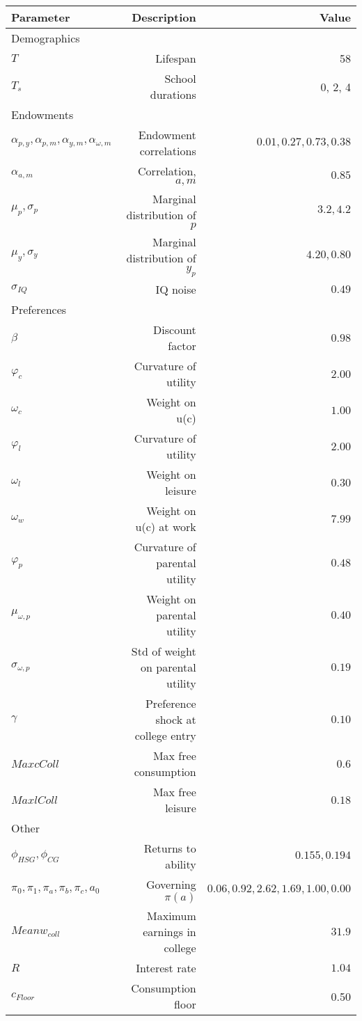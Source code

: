 \begin{tabular}{lrr}
\hline
Parameter & Description  & Value  \\
\hline
Demographics &   &   \\
$T$ & Lifespan  & 58  \\
$T_{s}$ & School durations  & 0, 2, 4  \\
Endowments &   &   \\
$\alpha_{p,y}, \alpha_{p,m}, \alpha_{y,m}, \alpha_{\omega,m}$ & Endowment correlations  & $0.01, 0.27, 0.73, 0.38$  \\
$\alpha_{a,m}$ & Correlation, $a,m$  & $0.85$  \\
$\mu_{p}, \sigma_{p}$ & Marginal distribution of $p$  & $3.2, 4.2$  \\
$\mu_{y}, \sigma_{y}$ & Marginal distribution of $y_{p}$  & $4.20, 0.80$  \\
$\sigma_{IQ}$ & IQ noise  & $0.49$  \\
Preferences &   &   \\
$\beta$ & Discount factor  & $0.98$  \\
$\varphi_{c}$ & Curvature of utility  & $2.00$  \\
$\omega_{c}$ & Weight on u(c)  & $1.00$  \\
$\varphi_{l}$ & Curvature of utility  & $2.00$  \\
$\omega_{l}$ & Weight on leisure  & $0.30$  \\
$\omega_{w}$ & Weight on u(c) at work  & $7.99$  \\
$\varphi_{p}$ & Curvature of parental utility  & $0.48$  \\
$\mu_{\omega,p}$ & Weight on parental utility  & $0.40$  \\
$\sigma_{\omega,p}$ & Std of weight on parental utility  & $0.19$  \\
$\gamma$ & Preference shock at college entry  & $0.10$  \\
$Max cColl$ & Max free consumption  & $0.6$  \\
$Max lColl$ & Max free leisure  & $0.18$  \\
Other &   &   \\
$\phi_{HSG}, \phi_{CG}$ & Returns to ability  & $0.155, 0.194$  \\
$\pi_{0}, \pi_{1}, \pi_{a}, \pi_{b}, \pi_{c}, a_{0}$ & Governing $\pi(a)$  & $0.06, 0.92, 2.62, 1.69, 1.00, 0.00$  \\
$Mean w_{coll}$ & Maximum earnings in college  & $31.9$  \\
$R$ & Interest rate  & $1.04$  \\
$c_{Floor}$ & Consumption floor  & 0.50  \\
\hline
\end{tabular}%
